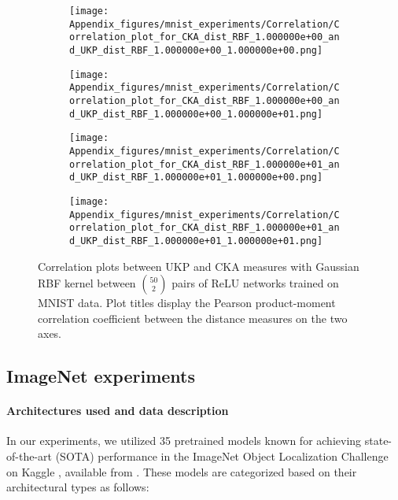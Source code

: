 \documentclass{article} %
\theoremstyle{plain}
\begin{document}
\raggedbottom

\begin{figure}[!h]
    \centering
    \begin{subfigure}[b]{0.45\textwidth}
        \texttt{[image: Appendix\_figures/mnist\_experiments/Correlation/Correlation\_plot\_for\_CKA\_dist\_RBF\_1.000000e+00\_and\_UKP\_dist\_RBF\_1.000000e+00\_1.000000e+00.png]}
    \end{subfigure}
    \hfill
    \begin{subfigure}[b]{0.45\textwidth}
        \texttt{[image: Appendix\_figures/mnist\_experiments/Correlation/Correlation\_plot\_for\_CKA\_dist\_RBF\_1.000000e+00\_and\_UKP\_dist\_RBF\_1.000000e+00\_1.000000e+01.png]}
    \end{subfigure}
    
    \vspace{0.5cm}  %
    
    \begin{subfigure}[b]{0.45\textwidth}
        \texttt{[image: Appendix\_figures/mnist\_experiments/Correlation/Correlation\_plot\_for\_CKA\_dist\_RBF\_1.000000e+01\_and\_UKP\_dist\_RBF\_1.000000e+01\_1.000000e+00.png]}
    \end{subfigure}
    \hfill
    \begin{subfigure}[b]{0.45\textwidth}
        \texttt{[image: Appendix\_figures/mnist\_experiments/Correlation/Correlation\_plot\_for\_CKA\_dist\_RBF\_1.000000e+01\_and\_UKP\_dist\_RBF\_1.000000e+01\_1.000000e+01.png]}
    \end{subfigure}
    
    \caption{Correlation plots between UKP and CKA measures with Gaussian RBF kernel between $\binom{50}{2}$ pairs of ReLU networks trained on MNIST data. Plot titles display the Pearson product-moment correlation coefficient between the distance measures on the two axes.}

    \label{MNIST correlation plots bw UKP CKA}
\end{figure}

\FloatBarrier

\subsection{ImageNet experiments}
\label{Additional ImageNet experiments}

\paragraph{Architectures used and data description} In our experiments, we utilized 35 pretrained models known for achieving state-of-the-art (SOTA) performance in the ImageNet Object Localization Challenge on Kaggle \cite{imagenet-object-localization-challenge}, available from \citet{pytorch}. These models are categorized based on their architectural types as follows:
\end{document}
